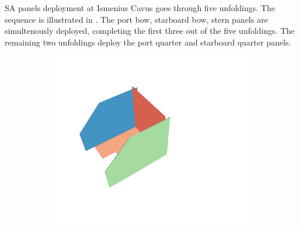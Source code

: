 \vspace{0.5cm}

\ac{SA} panels deployment at Ismenius Cavus goes through five unfoldings. The sequence is illustrated in . The port bow, starboard bow, stern panels are simultenously deployed, completing the first three out of the five unfoldings. The remaining two unfoldings deploy the port quarter and starboard quarter panels.

\vspace{0.5cm}

\begin{figure}[h]
\captionsetup[subfigure]{justification=centering}
\vspace{-2ex}
	\centering
    \setlength{\subfigureWidth}{0.32\textwidth}
    \setlength{\graphicsHeight}{30mm}
    \hypersetup{hidelinks=true}%
	\begin{subfigure}[t]{\subfigureWidth}
        \centering
		\includegraphics[height=\graphicsHeight]{sections/design/solar-array/images/deployment/ismenius-cavus/solar_array_deployment_ismenius_cavus_000.png}
		\label{fig:sub:deployment-sequence-ismenius-cavus-stowed}
	\end{subfigure}\hfill
	\begin{subfigure}[t]{\subfigureWidth}
        \centering

\end{subfigure}
\end{figure}
